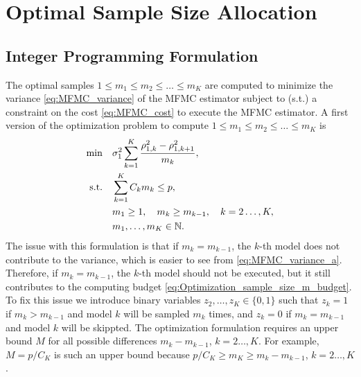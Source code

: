 \section{Optimal Sample Size Allocation}\label{sec:MFMC_Nk_optimize}

\subsection{Integer Programming Formulation}  \label{sec:MFMC_Nk_optimize_IP}
The optimal samples $1 \le m_1 \le m_2 \le \ldots \le m_K$ are computed to minimize
the variance \eqref{eq:MFMC_variance} of the MFMC estimator
subject to (s.t.) a constraint on the cost \eqref{eq:MFMC_cost} to execute the MFMC estimator.
A first version of the optimization problem to compute $1 \le m_1 \le m_2 \le \ldots \le m_K$ is
\begin{subequations}\label{eq:Optimization_sample_size_N}
    \begin{align}
    \min \quad &\sigma_1^2  \sum_{k=1}^K \frac{ \rho_{1,k}^2 - \rho_{1,k+1}^2}{m_k},   \\
       \text{s.t.}\quad & \sum_{k=1}^K C_km_k \le p,       \label{eq:Optimization_sample_size_m_budget}  \\
                                & m_1\ge 1,\quad  m_k \ge m_{k-1}, \quad k=2\ldots,K,\\
                                &m_1,\ldots, m_K\in \mathbb{N}.
    \end{align}
\end{subequations}
The issue with this formulation is that if $m_k = m_{k-1}$, the $k$-th model
does not contribute to the variance, which is easier to see from \eqref{eq:MFMC_variance_a}.
Therefore, if $m_k = m_{k-1}$, the $k$-th model should not be executed, but it still contributes to
the computing budget \eqref{eq:Optimization_sample_size_m_budget}.
To fix this issue we introduce binary variables $z_2, \ldots, z_K \in \{0,1\}$ such that
$z_k = 1$ if $m_k > m_{k-1}$ and model $k$ will be sampled $m_k$ times, and 
$z_k = 0$ if $m_k = m_{k-1}$ and model $k$ will be skippted.
The optimization formulation requires 
an upper bound $M$ for all possible differences $m_k - m_{k-1}$, $k=2\ldots,K$.
For example, $M = p/ C_K$ is such an upper bound because  $p/ C_K \ge m_K \ge m_k - m_{k-1}$, $k=2\ldots,K$.
